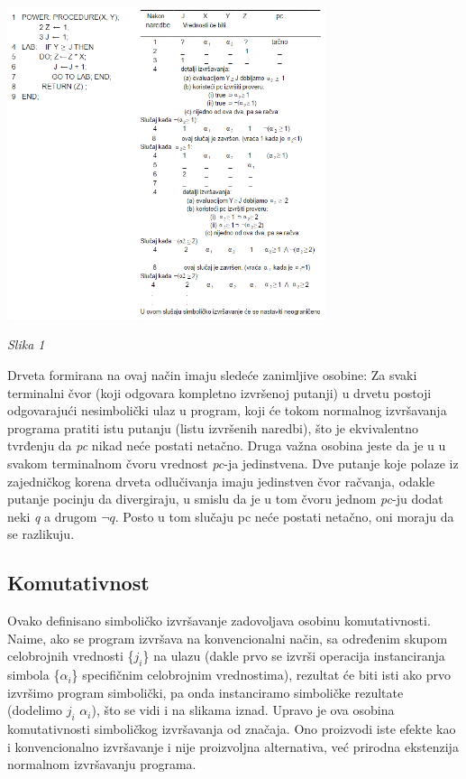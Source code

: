 \documentclass[a4paper]{article}
\begin{document}
{\includegraphics[width=0.7\textwidth]{Slika1}

\textit{Slika 1}

Drveta formirana na ovaj način imaju sledeće zanimljive osobine:
Za svaki terminalni čvor (koji odgovara kompletno izvršenoj putanji) u drvetu postoji odgovarajući nesimbolički ulaz u program, koji će tokom normalnog izvršavanja programa pratiti istu putanju (listu izvršenih naredbi), što je ekvivalentno tvrđenju  da \textit{pc} nikad neće postati netačno. Druga važna osobina jeste da je u u svakom terminalnom čvoru vrednost \textit{pc}-ja jedinstvena. Dve putanje koje polaze iz zajedničkog korena drveta odlučivanja imaju jedinstven čvor račvanja, odakle putanje pocinju da divergiraju, u smislu da je u tom čvoru jednom \textit{pc}-ju dodat neki \textit{q} a drugom $\neg q$. Posto u tom slučaju pc neće postati netačno, oni moraju da se razlikuju. 

\subsection{Komutativnost}

Ovako definisano simboličko izvršavanje zadovoljava osobinu komutativnosti. Naime, ako se program izvršava na konvencionalni način, sa određenim skupom celobrojnih vrednosti \{$j_i$\} na ulazu (dakle prvo se izvrši operacija instanciranja simbola \{$\alpha_i$\} specifičnim celobrojnim vrednostima), rezultat će biti isti ako prvo izvršimo program simbolički, pa onda instanciramo simboličke rezultate (dodelimo $j_i$ $\alpha_i$), što se vidi i na slikama iznad. Upravo je ova osobina komutativnosti simboličkog izvršavanja od značaja. Ono proizvodi iste efekte kao i konvencionalno izvršavanje i nije proizvoljna alternativa, već prirodna ekstenzija normalnom izvršavanju programa.

}
\end{document}
